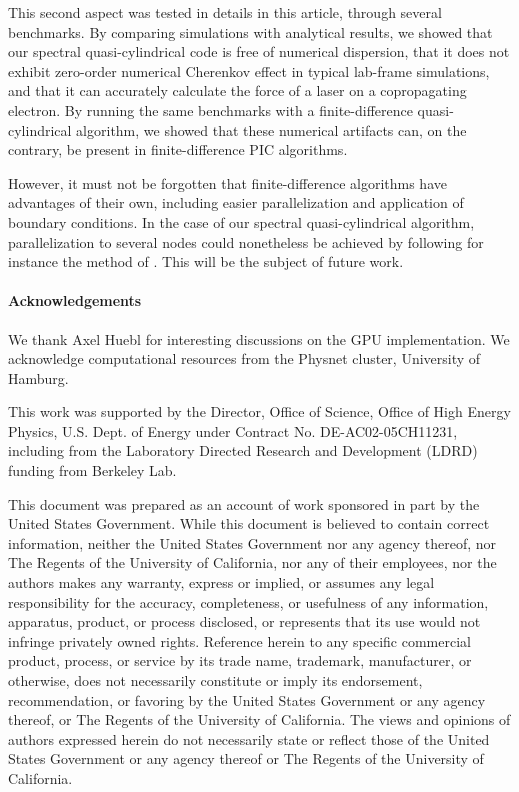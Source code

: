 \documentclass[1p,times]{elsarticle}
\begin{document}
This second aspect was tested in details in this article, through
several benchmarks. By comparing simulations with analytical results, 
we showed that our spectral quasi-cylindrical code is free of
numerical dispersion, that it does not exhibit zero-order numerical Cherenkov
effect in typical lab-frame
simulations, and that it can accurately calculate the force of a
laser on a copropagating electron. By running the
same benchmarks with a finite-difference quasi-cylindrical algorithm, we showed that
these numerical artifacts can, on the contrary, be present in
finite-difference PIC algorithms. 

However, it must not be forgotten that
finite-difference algorithms have advantages of their own, including
easier parallelization and application of boundary conditions. In the
case of our spectral quasi-cylindrical algorithm, parallelization to
several nodes could nonetheless be achieved by following for instance the
method of \citep{VayJCP2013}. This will be the subject of future work. 

\paragraph{Acknowledgements}

We thank Axel Huebl for interesting discussions on the GPU implementation.
We acknowledge computational resources from the Physnet cluster, University of Hamburg.

This work was supported by the Director, Office of Science, Office of High Energy Physics, U.S. Dept. of Energy under Contract No. DE-AC02-05CH11231, including from the Laboratory Directed Research and Development (LDRD) funding from Berkeley Lab.

This document was prepared as an account of work sponsored in part by the United States Government. While this document is believed to contain correct information, neither the United States Government nor any agency thereof, nor The Regents of the University of California, nor any of their employees, nor the authors makes any warranty, express or implied, or assumes any legal responsibility for the accuracy, completeness, or usefulness of any information, apparatus, product, or process disclosed, or represents that its use would not infringe privately owned rights. Reference herein to any specific commercial product, process, or service by its trade name, trademark, manufacturer, or otherwise, does not necessarily constitute or imply its endorsement, recommendation, or favoring by the United States Government or any agency thereof, or The Regents of the University of California. The views and opinions of authors expressed herein do not necessarily state or reflect those of the United States Government or any agency thereof or The Regents of the University of California.

\newpage
\appendix





\end{document}
